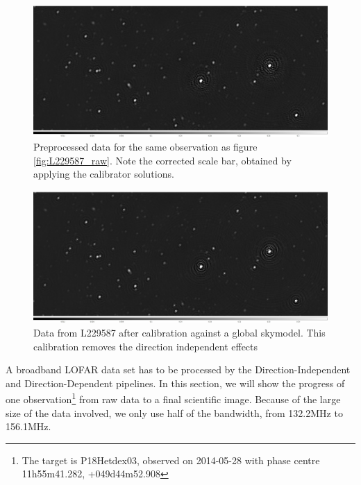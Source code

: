 \begin{figure}[!htb]
    \centering
    \includegraphics[width=.8\linewidth]{background/figures/prepcal_image.jpeg}
    \caption[Image of preprocessed data]{Preprocessed data for the same observation as figure \ref{fig:L229587_raw}. Note the corrected scale bar, obtained by applying the calibrator solutions.}
    \label{fig:L229587_prepcal}
\end{figure}
\begin{figure}[!htb]
    \centering
    \includegraphics[width=.8\linewidth]{background/figures/final_gsmacl.jpeg}
    \caption[Image of DI calibrated data]{Data from L229587 after calibration against a global skymodel. This calibration removes the direction independent effects}
    \label{fig:L229587_DI_cal}
\end{figure}


A broadband LOFAR data set has to be processed by the Direction-Independent and Direction-Dependent pipelines. In this section, we will show the progress of one observation\footnote{The target is P18Hetdex03, observed on 2014-05-28 with phase centre 11h55m41.282, +049d44m52.908} from raw data to a final scientific image. Because of the large size of the data involved, we only use half of the bandwidth, from 132.2MHz to 156.1MHz.

